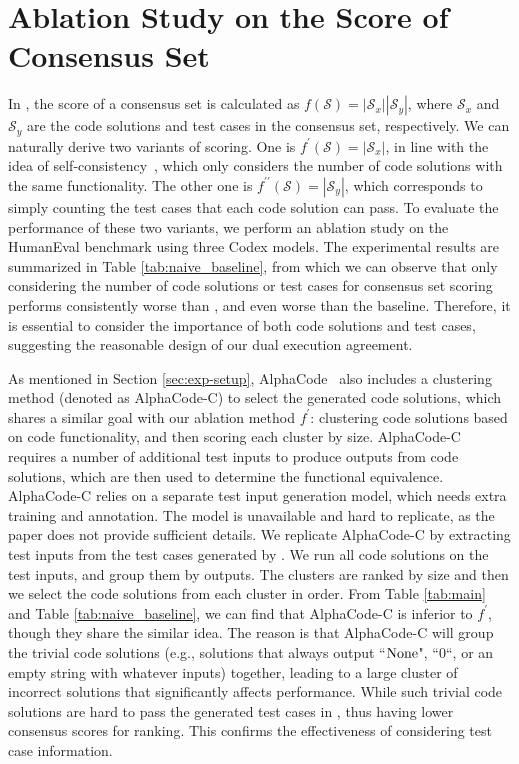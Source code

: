 \section{Ablation Study on the Score of Consensus Set}
\label{appendix_simplecount}
In \ours, the score of a consensus set is calculated as $f(\mathcal{S}) = |\mathcal{S}_x||\mathcal{S}_y|$, where $\mathcal{S}_x$ and $\mathcal{S}_y$ are the code solutions and test cases in the consensus set, respectively. We can naturally derive two variants of scoring.
One is $f^{\prime}(\mathcal{S}) = |\mathcal{S}_x|$, in line with the idea of self-consistency~\citep{wang2022self}, which only considers the number of code solutions with the same functionality.
The other one is $f^{\prime\prime}(\mathcal{S}) = |\mathcal{S}_y|$, which corresponds to simply counting the test cases that each code solution can pass. 
To evaluate the performance of these two variants, we perform an ablation study on the HumanEval benchmark using three Codex models. The experimental results are summarized in Table \ref{tab:naive_baseline}, from which we can observe that only considering the number of code solutions or test cases for consensus set scoring performs consistently worse than \ours, and even worse than the baseline. Therefore, it is essential to consider the importance of both code solutions and test cases, suggesting the reasonable design of our dual execution agreement.

As mentioned in Section \ref{sec:exp-setup}, AlphaCode~\citep{li2022competition} also includes a clustering method (denoted as AlphaCode-C) to select the generated code solutions, which shares a similar goal with our ablation method $f^{\prime}$: clustering code solutions based on code functionality, and then scoring each cluster by size. AlphaCode-C requires a number of additional test inputs to produce outputs from code solutions, which are then used to determine the functional equivalence. AlphaCode-C relies on a separate test input generation model, which needs extra training and annotation. The model is unavailable and hard to replicate, as the paper does not provide sufficient details. We replicate AlphaCode-C by extracting test inputs from the test cases generated by \ours. We run all code solutions on the test inputs, and group them by outputs. The clusters are ranked by size and then we select the code solutions from each cluster in order. From Table \ref{tab:main} and Table \ref{tab:naive_baseline}, we can find that AlphaCode-C is inferior to $f^{\prime}$, though they share the similar idea. The reason is that AlphaCode-C will group the trivial code solutions (e.g., solutions that always output ``$\rm{None}$", ``$0$“, or an empty string with whatever inputs) together, leading to a large cluster of incorrect solutions that significantly affects performance. While such trivial code solutions are hard to pass the generated test cases in \ours, thus having lower consensus scores for ranking. This confirms the effectiveness of considering test case information.

